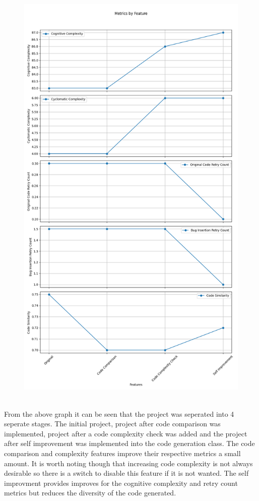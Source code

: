 \documentclass[12pt]{extarticle}
\begin{document}
\begin{figure}[h!]
\centering
\includegraphics[width=\textwidth, height=0.8\textheight, keepaspectratio]{Images/progress_plot.png}
\label{fig:progress_plot}
\end{figure}
\\
From the above graph it can be seen that the project was seperated into 4 seperate stages. The initial project, project after code comparison was implemented, project after a code complexity check was added and the project after self improvement was implemented into the code generation class. The code comparison and complexity features improve their respective metrics a small amount. It is worth noting though that increasing code complexity is not always desirable so there is a switch to disable this feature if it is not wanted. The self improvment provides improves for the cognitive complexity and retry count metrics but reduces the diversity of the code generated.\\
\end{document}
